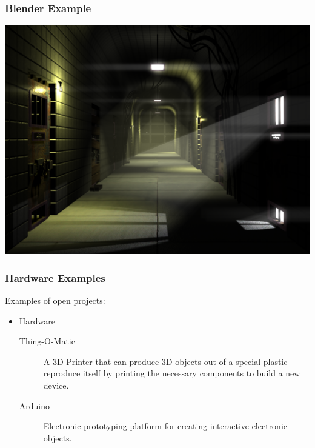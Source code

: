 \documentclass{beamer}
\begin{document}
\begin{frame}
  \frametitle{Blender Example}
    \includegraphics[width=\textwidth]{img/blendermine}
\end{frame}

\begin{frame}
  \frametitle{Hardware Examples}
  Examples of open projects:

  \begin{itemize}
  \item Hardware
    \begin{description}
    \item[Thing-O-Matic] A \textcolor{beamer@myblue}{3D} Printer that
      can produce 3D objects out of a special plastic
      \textcolor{beamer@myblue}{reproduce} itself by printing the
      necessary components to build a new device.
    \item[Arduino] Electronic prototyping platform for creating
      interactive electronic objects.
    \end{description}
  \end{itemize}
\end{frame}
\end{document}
